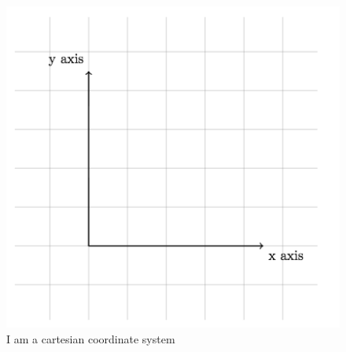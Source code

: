 \begin{figure}[h]
    \centering
    \includegraphics[scale=0.3]{image.png}
    \caption{I am a cartesian coordinate system}
    \label{fig:cartesian}
\end{figure}